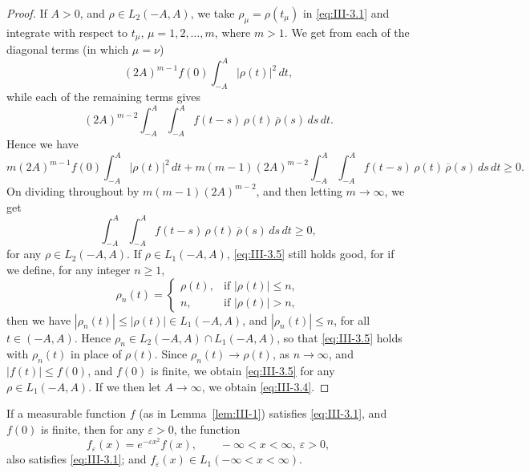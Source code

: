 \begin{proof}
If $A>0$, and $\rho\in L_{2}(-A,A)$, we take $\rho_{\mu}=\rho(t_{\mu})$ in \eqref{eq:III-3.1} and integrate with respect to $t_{\mu}$, $\mu=1,2,\dots,m$, where $m>1$. We get from each of the diagonal terms (in which $\mu=\nu$)
\[
(2A)^{m-1}f(0)\int_{-A}^{A}|\rho(t)|^{2}\,dt,
\]
while each of the remaining terms gives
\[
(2A)^{m-2}\int_{-A}^{A}\int_{-A}^{A}f(t-s)\,\rho(t)\,\overline{\rho}(s)\,ds\,dt.
\]
Hence we have
\[
m(2A)^{m-1}f(0)\int_{-A}^{A}|\rho(t)|^{2}\,dt
+m(m-1)(2A)^{m-2}\int_{-A}^{A}\int_{-A}^{A}f(t-s)\,\rho(t)\,\overline{\rho}(s)\,ds\,dt\ge0.
\]
On dividing throughout by $m(m-1)(2A)^{m-2}$, and then letting $m\to\infty$, we get
\begin{equation}\tag{3.5}\label{eq:III-3.5}
\int_{-A}^{A}\int_{-A}^{A}f(t-s)\,\rho(t)\,\overline{\rho}(s)\,ds\,dt\ge0,
\end{equation}
for any $\rho\in L_{2}(-A,A)$. If $\rho\in L_{1}(-A,A)$, \eqref{eq:III-3.5} still holds good, for if we define, for any integer $n\ge1$,
\[
\rho_{n}(t)=
\begin{cases}
\rho(t),&\text{if }|\rho(t)|\le n,\\
n,&\text{if }|\rho(t)|>n,
\end{cases}
\]
then we have $|\rho_{n}(t)|\le|\rho(t)|\in L_{1}(-A,A)$, and $|\rho_{n}(t)|\le n$, for all $t\in(-A,A)$. Hence $\rho_{n}\in L_{2}(-A,A)\cap L_{1}(-A,A)$, so that \eqref{eq:III-3.5} holds with $\rho_{n}(t)$ in place of $\rho(t)$. Since $\rho_{n}(t)\to\rho(t)$, as $n\to\infty$, and $|f(t)|\le f(0)$, and $f(0)$ is finite, we obtain \eqref{eq:III-3.5} for any $\rho\in L_{1}(-A,A)$. If we then let $A\to\infty$, we obtain \eqref{eq:III-3.4}.
\end{proof}

\begin{lemma}\label{lem:III-3}
If a measurable function $f$ (as in Lemma~\ref{lem:III-1}) satisfies \eqref{eq:III-3.1}, and $f(0)$ is finite, then for any $\varepsilon>0$, the function
\begin{equation}\tag{3.6}\label{eq:III-3.6}
f_{\varepsilon}(x)=e^{-\varepsilon x^{2}}f(x),\qquad-\infty<x<\infty,\ \varepsilon>0,
\end{equation}
also satisfies \eqref{eq:III-3.1}; and $f_{\varepsilon}(x)\in L_{1}(-\infty<x<\infty)$.
\end{lemma}

